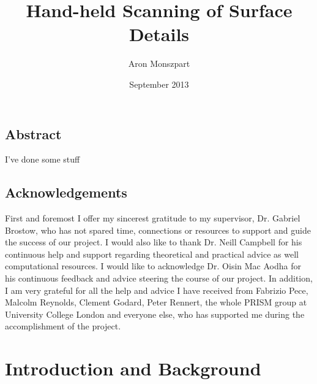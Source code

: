 \documentclass{ucl_thesis}
\author{Aron Monszpart}
\title{Hand-held Scanning of Surface Details}
\date{September 2013}
\begin{document}

\maketitle
{}
\setcounter{page}{1}
\pagestyle{plain}



\newpage
\section*{Abstract}
I've done some stuff
%


\newpage
\section*{Acknowledgements}
First and foremost I offer my sincerest gratitude to my supervisor, Dr. Gabriel Brostow, who has not spared time, connections or resources to support and guide the success of our project. I would also like to thank Dr. Neill Campbell for his continuous help and support regarding theoretical and practical advice as well computational resources. I would like to acknowledge Dr. Oisin Mac Aodha for his continuous feedback and advice steering the course of our project. In addition, I am very grateful for all the help and advice I have received from Fabrizio Pece, Malcolm Reynolds, Clement Godard, Peter Rennert, the whole PRISM group at University College London and everyone else, who has supported me during the accomplishment of the project.

\tableofcontents
\listoffigures
\newpage

\setcounter{page}{1}
\pagestyle{plain}

\chapter{Introduction and Background} 
\end{document}
